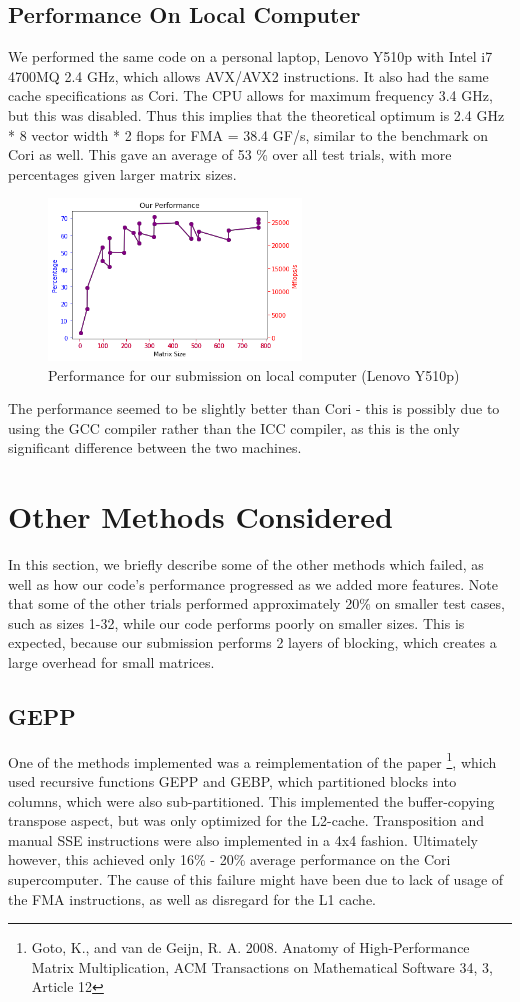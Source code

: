 \documentclass[12pt]{article}
\begin{document}
\subsection{Performance On Local Computer}
We performed the same code on a personal laptop, Lenovo Y510p with Intel i7 4700MQ 2.4 GHz, which allows AVX/AVX2 instructions. It also had the same cache specifications as Cori. The CPU allows for maximum frequency 3.4 GHz, but this was disabled. Thus this implies that the theoretical optimum is 2.4 GHz * 8 vector width * 2 flops for FMA = 38.4 GF/s, similar to the benchmark on Cori as well. This gave an average of 53 \% over all test trials, with more percentages given larger matrix sizes. 
\begin{figure}[h]
  \caption{Performance for our submission on local computer (Lenovo Y510p)}
  \centering
    \includegraphics[width=0.6\textwidth]{our_performance_graph_lenovo.png}
\end{figure}
The performance seemed to be slightly better than Cori - this is possibly due to using the GCC compiler rather than the ICC compiler, as this is the only significant difference between the two machines. 


\section{Other Methods Considered}
In this section, we briefly describe some of the other methods which failed, as well as how our code's performance progressed as we added more features. Note that some of the other trials performed approximately 20\% on smaller test cases, such as sizes 1-32, while our code performs poorly on smaller sizes. This is expected, because our submission performs 2 layers of blocking, which creates a large overhead for small matrices.

\subsection{GEPP} 
One of the methods implemented was a reimplementation of the paper \footnote{Goto, K., and van de Geijn, R. A. 2008. Anatomy of High-Performance Matrix Multiplication, ACM Transactions on Mathematical Software 34, 3, Article 12}, which used recursive functions GEPP and GEBP, which partitioned blocks into columns, which were also sub-partitioned. This implemented the buffer-copying transpose aspect, but was only optimized for the L2-cache. Transposition and manual SSE instructions were also implemented in a 4x4 fashion. Ultimately however, this achieved only 16\% - 20\% average performance on the Cori supercomputer. The cause of this failure might have been due to lack of usage of the FMA instructions, as well as disregard for the L1 cache. 
\end{document}
